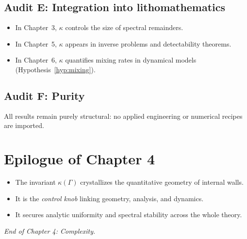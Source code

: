 \subsection*{Audit E: Integration into lithomathematics}
\begin{itemize}
  \item In Chapter~3, $\kappa$ controls the size of spectral remainders.
  \item In Chapter~5, $\kappa$ appears in inverse problems and detectability theorems.
  \item In Chapter~6, $\kappa$ quantifies mixing rates in dynamical models (Hypothesis~\ref{hyp:mixing}).
\end{itemize}

\subsection*{Audit F: Purity}
All results remain purely structural: no applied engineering or numerical recipes are imported.

\section{Epilogue of Chapter 4}
\label{sec:epilogue-ch4}

\begin{itemize}
  \item The invariant $\kappa(\Gamma)$ crystallizes the quantitative geometry of internal walls.
  \item It is the \emph{control knob} linking geometry, analysis, and dynamics.
  \item It secures analytic uniformity and spectral stability across the whole theory.
\end{itemize}

\begin{flushright}
\emph{End of Chapter 4: Complexity.}
\end{flushright}

